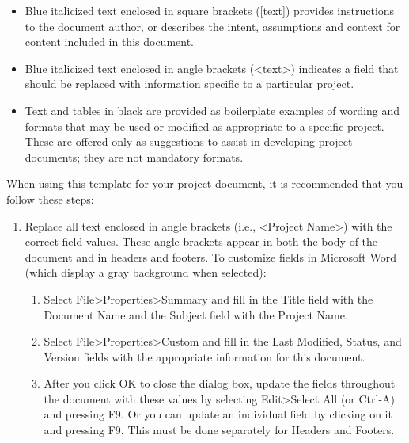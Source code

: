 \documentclass[a4paper, 11pt]{article}
\begin{document}
\begin{itemize}
\item
  Blue italicized text enclosed in square brackets ({[}text{]}) provides
  instructions to the document author, or describes the intent,
  assumptions and context for content included in this document.
\item
  Blue italicized text enclosed in angle brackets
  (\textless{}text\textgreater{}) indicates a field that should be
  replaced with information specific to a particular project.
\item
  Text and tables in black are provided as boilerplate examples of
  wording and formats that may be used or modified as appropriate to a
  specific project. These are offered only as suggestions to assist in
  developing project documents; they are not mandatory formats.
\end{itemize}

When using this template for your project document, it is recommended
that you follow these steps:

\begin{enumerate}
\def\labelenumi{\arabic{enumi}.}
\item
  Replace all text enclosed in angle brackets (i.e., \textless{}Project
  Name\textgreater{}) with the correct field values. These angle
  brackets appear in both the body of the document and in headers and
  footers. To customize fields in Microsoft Word (which display a gray
  background when selected):

  \begin{enumerate}
  \def\labelenumii{\alph{enumii}.}
  \item
    Select File\textgreater{}Properties\textgreater{}Summary and fill in
    the Title field with the Document Name and the Subject field with
    the Project Name.
  \item
    Select File\textgreater{}Properties\textgreater{}Custom and fill in
    the Last Modified, Status, and Version fields with the appropriate
    information for this document.
  \item
    After you click OK to close the dialog box, update the fields
    throughout the document with these values by selecting
    Edit\textgreater{}Select All (or Ctrl-A) and pressing F9. Or you can
    update an individual field by clicking on it and pressing F9. This
    must be done separately for Headers and Footers.
  \end{enumerate}
\end{enumerate}
\end{document}
